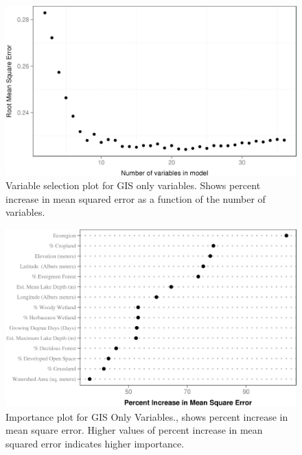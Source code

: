 \documentclass[12pt,]{article}
\begin{document}
\newpage

\begin{figure}[htbp]
\centering
\includegraphics{manuscript_files/figure-latex/gis_var_sel_figure-1.jpeg}
\caption{Variable selection plot for GIS only variables. Shows percent
increase in mean squared error as a function of the number of variables.
\label{fig:gis_varsel_figure}}
\end{figure}

\newpage

\begin{figure}[htbp]
\centering
\includegraphics{manuscript_files/figure-latex/GIS_Importance-1.jpeg}
\caption{Importance plot for GIS Only Variables., shows percent increase
in mean square error. Higher values of percent increase in mean squared
error indicates higher importance. \label{fig:GIS_Importance}}
\end{figure}

\newpage
\end{document}
